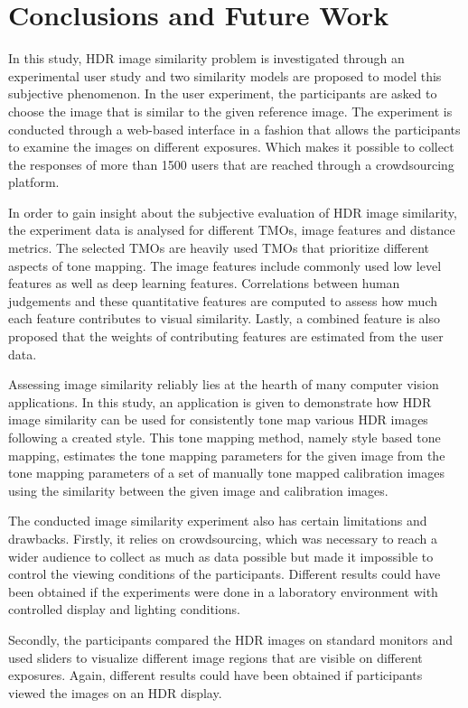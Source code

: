 \chapter{Conclusions and Future Work}
\label{chp:b7}

In this study, HDR image similarity problem is investigated through an experimental user study and two similarity models are proposed to model this subjective phenomenon. In the user experiment, the participants are asked to choose the image that is similar to the given reference image. The experiment is conducted through a web-based interface in a fashion that allows the participants to examine the images on different exposures. Which makes it possible to collect the responses of more than 1500 users that are reached through a crowdsourcing platform.

In order to gain insight about the subjective evaluation of HDR image similarity, the experiment data is analysed for different TMOs, image features and distance metrics. The selected TMOs are heavily used TMOs that prioritize different aspects of tone mapping. The image features include commonly used low level features as well as deep learning features. Correlations between human judgements and these quantitative features are computed to assess how much each feature contributes to visual similarity. Lastly, a combined feature is also proposed that the weights of contributing features are estimated from the user data.

Assessing image similarity reliably lies at the hearth of many computer vision applications. In this study, an application is given to demonstrate how HDR image similarity can be used for consistently tone map various HDR images following a created style. This tone mapping method, namely style based tone mapping, estimates the tone mapping parameters for the given image from the tone mapping parameters of a set of manually tone mapped calibration images using the similarity between the given image and calibration images. 

The conducted image similarity experiment also has certain limitations and drawbacks. Firstly, it relies on crowdsourcing, which was necessary to reach a wider audience to collect as much as data possible but made it impossible to control the viewing conditions of the participants. Different results could have been obtained if the experiments were done in a laboratory environment with controlled display and lighting conditions.

Secondly, the participants compared the HDR images on standard monitors and used sliders to visualize different image regions that are visible on different exposures. Again, different results could have been obtained if participants viewed the images on an HDR display. 

